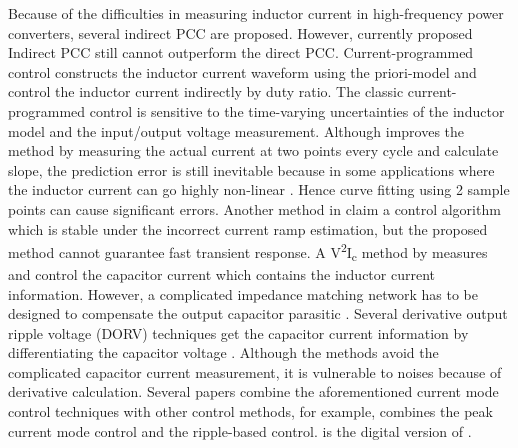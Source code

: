Because of the difficulties in measuring inductor current in high-frequency power converters, several indirect PCC are proposed. However, currently proposed Indirect PCC  still cannot outperform the direct PCC.
Current-programmed control constructs the inductor current waveform using the priori-model and control the inductor current indirectly by duty ratio.
The classic current-programmed control \cite{Chendragan2003} is sensitive to the time-varying uncertainties of the inductor model and the input/output voltage measurement. Although \cite{Taeed2014} improves the method by measuring the actual current at two points every cycle and calculate slope, the prediction error is still inevitable because in some applications where the inductor current can go highly non-linear \cite{Ahsanuzzamanprodic2012apec} \cite{DiCapua2016}. Hence curve fitting using 2 sample points can cause significant errors. Another method in \cite{Chattopadhyay2006} claim a control algorithm which is stable under the incorrect current ramp estimation, but the proposed method cannot guarantee fast transient response.
A V\textsuperscript{2}I\textsubscript{c} method by \cite{Huerta2013} measures and control the capacitor current which contains the inductor current information.
However, a complicated impedance matching network has to be designed to compensate the output capacitor parasitic 
\cite{Huerta2009a}. Several derivative output ripple voltage (DORV) techniques get the capacitor current information by differentiating the capacitor voltage \cite{Mai2008} \cite{Chen2017}. Although the methods avoid the complicated capacitor current measurement, it is vulnerable to noises because of derivative calculation. 
Several papers combine the aforementioned current mode control techniques with other control methods, for example, \cite{Huang2002} combines the peak current mode control and the ripple-based control. \cite{Kuang-Yao2013a} is the digital version of  \cite{Huang2002}.